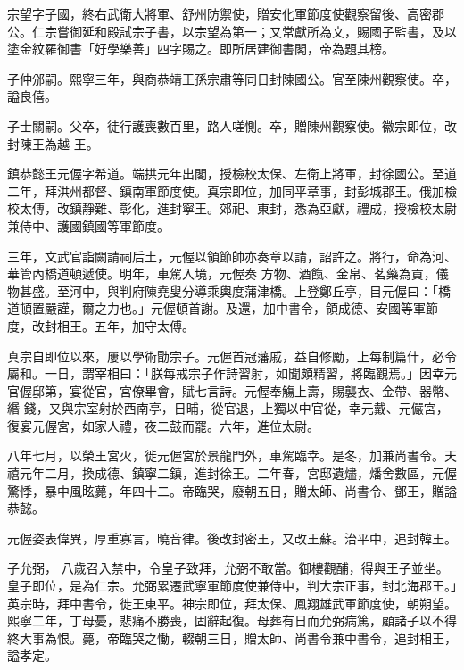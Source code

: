 \begin{pinyinscope}
 宗望字子國，終右武衛大將軍、舒州防禦使，贈安化軍節度使觀察留後、高密郡公。仁宗嘗御延和殿試宗子書，以宗望為第一；又常獻所為文，賜國子監書，及以塗金紋羅御書「好學樂善」四字賜之。即所居建御書閣，帝為題其榜。



 子仲邠嗣。熙寧三年，與商恭靖王孫宗肅等同日封陳國公。官至陳州觀察使。卒，謚良僖。



 子士關嗣。父卒，徒行護喪數百里，路人嗟惻。卒，贈陳州觀察使。徽宗即位，改封陳王為越
 王。



 鎮恭懿王元偓字希道。端拱元年出閣，授檢校太保、左衛上將軍，封徐國公。至道二年，拜洪州都督、鎮南軍節度使。真宗即位，加同平章事，封彭城郡王。俄加檢校太傅，改鎮靜難、彰化，進封寧王。郊祀、東封，悉為亞獻，禮成，授檢校太尉兼侍中、護國鎮國等軍節度。



 三年，文武官詣闕請祠后土，元偓以領節帥亦奏章以請，詔許之。將行，命為河、華管內橋道頓遞使。明年，車駕入境，元偓奏
 方物、酒餼、金帛、茗藥為貢，儀物甚盛。至河中，與判府陳堯叟分導乘輿度蒲津橋。上登鄭丘亭，目元偓曰：「橋道頓置嚴謹，爾之力也。」元偓頓首謝。及還，加中書令，領成德、安國等軍節度，改封相王。五年，加守太傅。



 真宗自即位以來，屢以學術勖宗子。元偓首冠藩戚，益自修勵，上每制篇什，必令屬和。一日，謂宰相曰：「朕每戒宗子作詩習射，如聞頗精習，將臨觀焉。」因幸元官偓邸第，宴從官，宮僚畢會，賦七言詩。元偓奉觴上壽，賜襲衣、金帶、器幣、緡
 錢，又與宗室射於西南亭，日晡，從官退，上獨以中官從，幸元戴、元儼宮，復宴元偓宮，如家人禮，夜二鼓而罷。六年，進位太尉。



 八年七月，以榮王宮火，徙元偓宮於景龍門外，車駕臨幸。是冬，加兼尚書令。天禧元年二月，換成德、鎮寧二鎮，進封徐王。二年春，宮邸遺燼，燔舍數區，元偓驚悸，暴中風眩薨，年四十二。帝臨哭，廢朝五日，贈太師、尚書令、鄧王，贈謚恭懿。



 元偓姿表偉異，厚重寡言，曉音律。後改封密王，又改王蘇。治平中，追封韓王。



 子允弼，
 八歲召入禁中，令皇子致拜，允弼不敢當。御樓觀酺，得與王子並坐。皇子即位，是為仁宗。允弼累遷武寧軍節度使兼侍中，判大宗正事，封北海郡王。」英宗時，拜中書令，徙王東平。神宗即位，拜太保、鳳翔雄武軍節度使，朝朔望。熙寧二年，丁母憂，悲痛不勝喪，固辭起復。母葬有日而允弼病篤，顧諸子以不得終大事為恨。薨，帝臨哭之慟，輟朝三日，贈太師、尚書令兼中書令，追封相王，謚孝定。




\end{pinyinscope}
